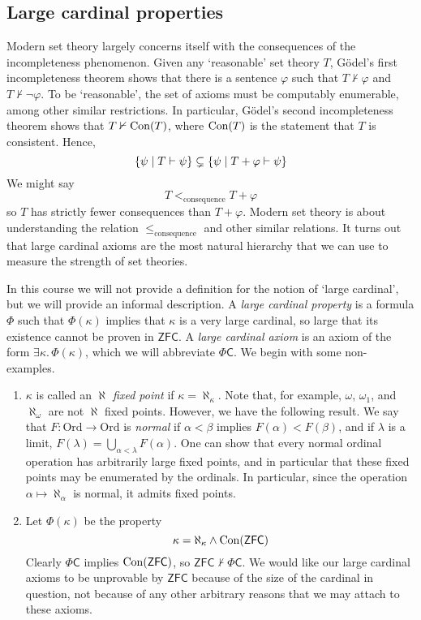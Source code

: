\subsection{Large cardinal properties}
Modern set theory largely concerns itself with the consequences of the incompleteness phenomenon.
Given any `reasonable' set theory \( T \), G\"odel's first incompleteness theorem shows that there is a sentence \( \varphi \) such that \( T \nvdash \varphi \) and \( T \nvdash \neg\varphi \).
To be `reasonable', the set of axioms must be computably enumerable, among other similar restrictions.
In particular, G\"odel's second incompleteness theorem shows that \( T \nvdash \operatorname{Con}(T) \), where \( \operatorname{Con}(T) \) is the statement that \( T \) is consistent.
Hence,
\[ \qty{\psi \mid T \vdash \psi} \subsetneq \qty{\psi \mid T + \varphi \vdash \psi} \]
We might say
\[ T <_{\text{consequence}} T + \varphi \]
so \( T \) has strictly fewer consequences than \( T + \varphi \).
Modern set theory is about understanding the relation \( \leq_{\text{consequence}} \) and other similar relations.
It turns out that large cardinal axioms are the most natural hierarchy that we can use to measure the strength of set theories.

In this course we will not provide a definition for the notion of `large cardinal', but we will provide an informal description.
A \emph{large cardinal property} is a formula \( \Phi \) such that \( \Phi(\kappa) \) implies that \( \kappa \) is a very large cardinal, so large that its existence cannot be proven in \( \mathsf{ZFC} \).
A \emph{large cardinal axiom} is an axiom of the form \( \exists \kappa.\, \Phi(\kappa) \), which we will abbreviate \( \Phi \mathsf{C} \).
We begin with some non-examples.

\begin{enumerate}
    \item \( \kappa \) is called an \emph{\( \aleph \) fixed point} if \( \kappa = \aleph_\kappa \).
    Note that, for example, \( \omega \), \( \omega_1 \), and \( \aleph_\omega \) are not \( \aleph \) fixed points.
    However, we have the following result.
    We say that \( F : \mathrm{Ord} \to \mathrm{Ord} \) is \emph{normal} if \( \alpha < \beta \) implies \( F(\alpha) < F(\beta) \), and if \( \lambda \) is a limit, \( F(\lambda) = \bigcup_{\alpha < \lambda} F(\alpha) \).
    One can show that every normal ordinal operation has arbitrarily large fixed points, and in particular that these fixed points may be enumerated by the ordinals.
    In particular, since the operation \( \alpha \mapsto \aleph_\alpha \) is normal, it admits fixed points.
    \item Let \( \Phi(\kappa) \) be the property
    \[ \kappa = \aleph_\kappa \wedge \operatorname{Con}(\mathsf{ZFC}) \]
    Clearly \( \Phi \mathsf{C} \) implies \( \operatorname{Con}(\mathsf{ZFC}) \), so \( \mathsf{ZFC} \nvdash \Phi \mathsf{C} \).
    We would like our large cardinal axioms to be unprovable by \( \mathsf{ZFC} \) because of the size of the cardinal in question, not because of any other arbitrary reasons that we may attach to these axioms.
\end{enumerate}

